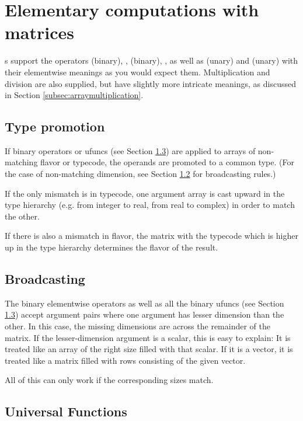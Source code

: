 \section{Elementary computations with matrices}
s support the operators \code{+} (binary), \code{+=},
\code{-} (binary), \code{-=}, as well as \code{+} (unary) and \code{-}
(unary) with their elementwise meanings as you would expect them.
Multiplication and division are also supplied, but have slightly more
intricate meanings, as discussed in Section
\ref{subsec:arraymultiplication}.

\subsection{Type promotion}
\label{subsec:arraypromotion}

If binary operators or ufuncs (see Section \ref{subsec:ufuncs})
are applied to arrays of non-matching flavor or typecode,
the operands are promoted to a common type. (For the case of
non-matching dimension, see Section \ref{subsec:arraybroadcast}
for broadcasting rules.)

If the only mismatch is in typecode, one argument array
is cast upward in the type hierarchy (e.g. from integer to real,
from real to complex) in order to match the other.

If there is also a mismatch in flavor, the matrix with the typecode
which is higher up in the type hierarchy determines the flavor of the
result.

\subsection{Broadcasting}
\label{subsec:arraybroadcast}

The binary elementwise operators as well as all the binary ufuncs (see
Section \ref{subsec:ufuncs}) accept argument pairs where one argument
has lesser dimension than the other. In this case, the missing dimensions
are  across the remainder of the
matrix. If the lesser-dimension argument is a scalar, this is easy to
explain: It is treated like an array of the right size filled with
that scalar. If it is a vector, it is treated like a matrix filled
with rows consisting of the given vector.

All of this can only work if the corresponding  sizes 
match.

\subsection{Universal Functions}
\label{subsec:ufuncs}

